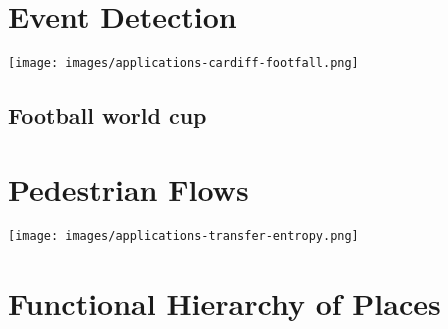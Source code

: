 \lipsum[1-2]

\section{Event Detection}

\begin{figure*}
  \forceversofloat
  \texttt{[image: images/applications-cardiff-footfall.png]}
  \caption{}
  \label{}
\end{figure*}

\lipsum[1]


\subsection{Football world cup}


\section{Pedestrian Flows}

\begin{figure*}
  \forceversofloat
  \texttt{[image: images/applications-transfer-entropy.png]}
  \caption{}
  \label{}
\end{figure*}


\section{Functional Hierarchy of Places}

